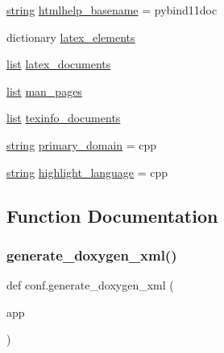 \begin{DoxyCompactItemize}
\item 
\mbox{\hyperlink{asdl_8h_ae84541b4f3d8e1ea24ec0f466a8c568b}{string}} \mbox{\hyperlink{namespaceconf_aab7fddb2766ce3c430d8246fbfdbc7b1}{htmlhelp\+\_\+basename}} = \textquotesingle{}pybind11doc\textquotesingle{}
\item 
dictionary \mbox{\hyperlink{namespaceconf_a33619d385ad23765ac6ebb58bf82d43d}{latex\+\_\+elements}}
\item 
\mbox{\hyperlink{classlist}{list}} \mbox{\hyperlink{namespaceconf_a7812f49970f3de0d15dd7b9b9a10e3a1}{latex\+\_\+documents}}
\item 
\mbox{\hyperlink{classlist}{list}} \mbox{\hyperlink{namespaceconf_a85efc5fee48a26fa2d651f6eeb38fc2b}{man\+\_\+pages}}
\item 
\mbox{\hyperlink{classlist}{list}} \mbox{\hyperlink{namespaceconf_a54b0faed214ac92017d5689efbb10672}{texinfo\+\_\+documents}}
\item 
\mbox{\hyperlink{asdl_8h_ae84541b4f3d8e1ea24ec0f466a8c568b}{string}} \mbox{\hyperlink{namespaceconf_a7f24fa2b2e1f3905d88d035c328cc9f7}{primary\+\_\+domain}} = \textquotesingle{}cpp\textquotesingle{}
\item 
\mbox{\hyperlink{asdl_8h_ae84541b4f3d8e1ea24ec0f466a8c568b}{string}} \mbox{\hyperlink{namespaceconf_a3117edf4443d9b8c70a9f0f44294ba79}{highlight\+\_\+language}} = \textquotesingle{}cpp\textquotesingle{}
\end{DoxyCompactItemize}


\subsection{Function Documentation}
\mbox{\label{namespaceconf_a7d797ba34f8be1c89a804f65bc58235d}} 
\subsubsection{\texorpdfstring{generate\_doxygen\_xml()}{generate\_doxygen\_xml()}}
{\footnotesize\ttfamily def conf.\+generate\+\_\+doxygen\+\_\+xml (\begin{DoxyParamCaption}\item[{}]{app }\end{DoxyParamCaption})}

\mbox{\label{namespaceconf_ab10c3cab2b831ad54a5b330ce0f414e0}} 

